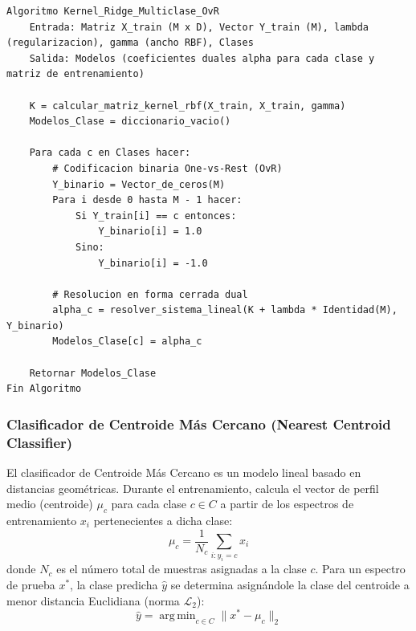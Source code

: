 \begin{lstlisting}[caption=Entrenamiento y Prediccion de Clasificador Kernel Ridge Multiclase]
Algoritmo Kernel_Ridge_Multiclase_OvR
    Entrada: Matriz X_train (M x D), Vector Y_train (M), lambda (regularizacion), gamma (ancho RBF), Clases
    Salida: Modelos (coeficientes duales alpha para cada clase y matriz de entrenamiento)

    K = calcular_matriz_kernel_rbf(X_train, X_train, gamma)
    Modelos_Clase = diccionario_vacio()
    
    Para cada c en Clases hacer:
        # Codificacion binaria One-vs-Rest (OvR)
        Y_binario = Vector_de_ceros(M)
        Para i desde 0 hasta M - 1 hacer:
            Si Y_train[i] == c entonces:
                Y_binario[i] = 1.0
            Sino:
                Y_binario[i] = -1.0
                
        # Resolucion en forma cerrada dual
        alpha_c = resolver_sistema_lineal(K + lambda * Identidad(M), Y_binario)
        Modelos_Clase[c] = alpha_c
        
    Retornar Modelos_Clase
Fin Algoritmo
\end{lstlisting}

\subsubsection{Clasificador de Centroide Más Cercano (Nearest Centroid Classifier)}
El clasificador de Centroide Más Cercano es un modelo lineal basado en distancias geométricas. Durante el entrenamiento, calcula el vector de perfil medio (centroide) $\mu_c$ para cada clase $c \in C$ a partir de los espectros de entrenamiento $x_i$ pertenecientes a dicha clase:
\begin{equation}
    \mu_c = \frac{1}{N_c} \sum_{i: y_i = c} x_i
\end{equation}
donde $N_c$ es el número total de muestras asignadas a la clase $c$. Para un espectro de prueba $x^*$, la clase predicha $\hat{y}$ se determina asignándole la clase del centroide a menor distancia Euclidiana (norma $\mathcal{L}_2$):
\begin{equation}
    \hat{y} = \operatorname{arg\,min}_{c \in C} \|x^* - \mu_c\|_2
\end{equation}

